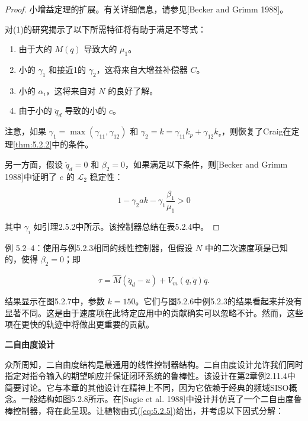 \documentclass[UTF8,12pt,a4paper]{ctexart}
\begin{document}
\begin{proof}
小增益定理的扩展。有关详细信息，请参见[Becker and Grimm 1988]。

对(1)的研究揭示了以下所需特征将有助于满足不等式：
\begin{enumerate}
    \item 由于大的 $M(q)$ 导致大的 $\mu_1$。
    \item 小的 $\gamma_1$ 和接近1的 $\gamma_2$，这将来自大增益补偿器 $C$。
    \item 小的 $\alpha_i$，这将来自对 $N$ 的良好了解。
    \item 由于小的 $\ddot{q}_d$ 导致的小的 $c$。
\end{enumerate}

注意，如果 $\gamma_1 = \max(\gamma_{11}, \gamma_{12})$ 和 $\gamma_2 = k = \gamma_{11}k_p + \gamma_{12}k_v$，则恢复了Craig在定理\ref{thm:5.2.2}中的条件。

另一方面，假设 $\ddot{q}_d = 0$ 和 $\beta_2 = 0$，如果满足以下条件，则[Becker and Grimm 1988]中证明了 $e$ 的 $\mathcal{L}_2$ 稳定性：

\begin{equation}\label{eq:5.2.36}
1 - \gamma_2 ak - \gamma_1\frac{\beta_1}{\mu_1} > 0
\end{equation}

其中 $\gamma_i$ 如引理2.5.2中所示。该控制器总结在表5.2.4中。
\end{proof}

\begin{example}[动态一自由度设计]
例 5.2--4：使用与例5.2.3相同的线性控制器，但假设 $N$ 中的二次速度项是已知的，使得 $\beta_2 = 0$；即

\begin{equation*}
\tau = \hat{M}(\ddot{q}_d - u) + V_m(q, \dot{q})\dot{q}.
\end{equation*}

结果显示在图5.2.7中，参数 $k = 150$。它们与图5.2.6中例5.2.3的结果看起来并没有显著不同。这是由于速度项在此特定应用中的贡献确实可以忽略不计。然而，这些项在更快的轨迹中将做出更重要的贡献。
\end{example}

\textbf{二自由度设计}

众所周知，二自由度结构是最通用的线性控制器结构。二自由度设计允许我们同时指定对指令输入的期望响应并保证闭环系统的鲁棒性。该设计在第2章例2.11.4中简要讨论。它与本章的其他设计在精神上不同，因为它依赖于经典的频域SISO概念。一般结构如图5.2.8所示。在[Sugie et al. 1988]中设计并仿真了一个二自由度鲁棒控制器，将在此呈现。让植物由式(\ref{eq:5.2.5})给出，并考虑以下因式分解：
\end{document}
